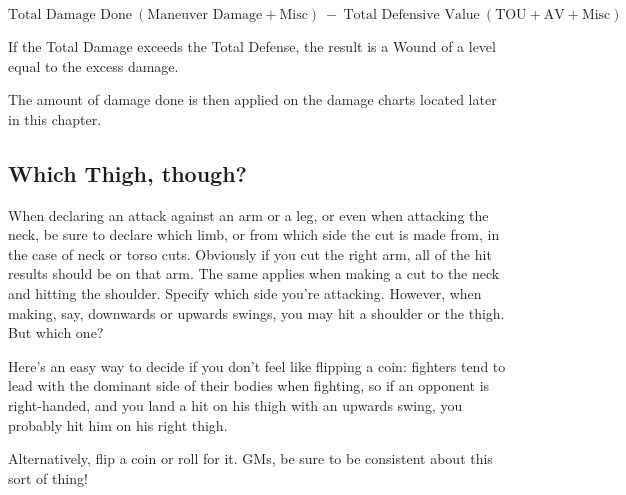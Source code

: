 \documentclass[oneside,11pt,english]{book}
\begin{document}
\[\text{Total Damage Done}~(\text{Maneuver Damage}+\text{Misc}) ~-~ \text{Total Defensive Value}~(\text{TOU}+\text{AV} + \text{Misc})\]

If the Total Damage exceeds the Total Defense, the result is a Wound of a level equal to the excess 
damage.

The amount of damage done is then applied on the damage charts located later in this chapter.

\subsection*{Which Thigh, though?}
When declaring an attack against an arm or a leg, or even when attacking the neck, be sure to declare 
which limb, or from which side the cut is made from, in the case of neck or torso cuts. Obviously if you 
cut the right arm, all of the hit results should be on that arm. The same applies when making a cut to the 
neck and hitting the shoulder. Specify which side you’re attacking.
However, when making, say, downwards or upwards swings, you may hit a shoulder or the thigh. But 
which one?

Here’s an easy way to decide if you don’t feel like flipping a coin: fighters tend to lead with the dominant 
side of their bodies when fighting, so if an opponent is right-handed, and you land a hit on his thigh with 
an upwards swing, you probably hit him on his right thigh.

Alternatively, flip a coin or roll for it. GMs, be sure to be consistent about this sort of thing!

\newpage
\end{document}
